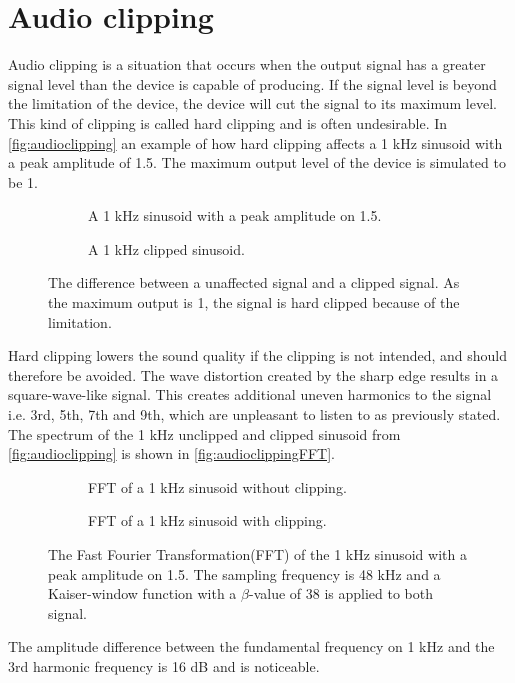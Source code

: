\section{Audio clipping}

Audio clipping is a situation that occurs when the output signal has a greater signal level than the device is capable of producing. If the signal level is beyond the limitation of the device, the device will cut the signal to its maximum level. This kind of clipping is called hard clipping and is often undesirable. In \autoref{fig:audioclipping} an example of how hard clipping affects a 1 kHz sinusoid with a peak amplitude of 1.5. The maximum output level of the device is simulated to be 1.

\begin{figure}[H]
\centering
\begin{subfigure}[t]{0.47\textwidth}
	
	\caption{A 1 kHz sinusoid with a peak amplitude on 1.5.}
	\label{fig:clippingClean}
\end{subfigure}
\hspace{6mm} 
\begin{subfigure}[t]{0.47\textwidth}
	
	\caption{A 1 kHz clipped sinusoid.}
	\label{fig:clippingDist}
\end{subfigure}
\caption{The difference between a unaffected signal and a clipped signal. As the maximum output is 1, the signal is hard clipped because of the limitation.}
\label{fig:audioclipping}
\end{figure}

Hard clipping lowers the sound quality if the clipping is not intended, and should therefore be avoided. The wave distortion created by the sharp edge results in a square-wave-like signal. This creates additional uneven harmonics to the signal i.e. 3rd, 5th, 7th and 9th, which are unpleasant to listen to as previously stated. The spectrum of the 1 kHz unclipped and clipped sinusoid from \autoref{fig:audioclipping} is shown in \autoref{fig:audioclippingFFT}.

\begin{figure}[H]
\centering
\begin{subfigure}[t]{0.47\textwidth}
	
	\caption{FFT of a 1 kHz sinusoid without clipping.}
	\label{fig:clippingCleanFFT}
\end{subfigure}
\hspace{6mm} 
\begin{subfigure}[t]{0.47\textwidth}
	
	\caption{FFT of a 1 kHz sinusoid with clipping.}
	\label{fig:clippingDistFFT}
\end{subfigure}
\caption{The Fast Fourier Transformation(FFT) of the 1 kHz sinusoid with a peak amplitude on 1.5. The sampling frequency is 48 kHz and a Kaiser-window function with a $\beta$-value of 38 is applied to both signal.}
\label{fig:audioclippingFFT}
\end{figure}

The amplitude difference between the fundamental frequency on 1 kHz and the 3rd harmonic frequency is 16 dB and is noticeable. 










